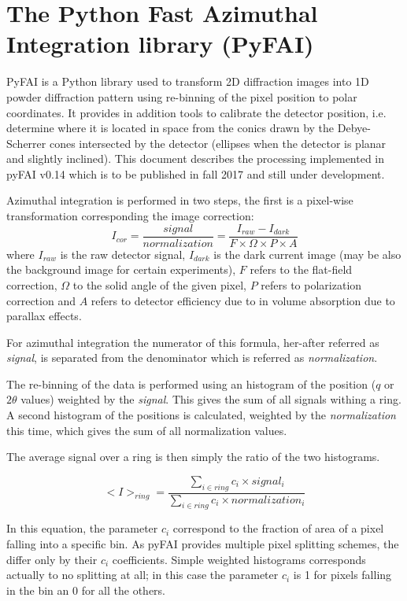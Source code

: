 \documentclass[preprint]{iucr}              %
\begin{document}
\section{The Python Fast Azimuthal Integration library (PyFAI)}

PyFAI is a Python \cite{python} library used to transform 2D diffraction images into
1D powder diffraction pattern using re-binning of the pixel position to polar coordinates.
It provides in addition tools to calibrate the detector position, i.e. determine
where it is located in space from the conics drawn by the Debye-Scherrer cones
intersected by the detector (ellipses when the detector is planar and slightly
inclined). This document describes the processing implemented in pyFAI
v0.14 which is to be published in fall 2017 and still under development.

Azimuthal integration is performed in two steps, the first is a pixel-wise
transformation corresponding the image correction:
$$
I_{cor} = \frac{signal}{normalization}  = \frac{I_{raw} - I_{dark}}{F \times
\Omega \times P \times A } $$
where $I_{raw}$ is the raw detector signal, $I_{dark}$ is the dark current
image (may be also the background image for certain experiments), $F$ refers to
the flat-field correction, $\Omega$ to the solid angle of the given pixel, $P$
refers to polarization correction and $A$ refers to detector efficiency due
to in volume absorption due to parallax effects.

For azimuthal integration the numerator of this formula, her-after referred as
\textit{signal}, is separated from the denominator which is referred as
\textit{normalization}.

The re-binning of the data is performed using an histogram of the position ($q$
or $2\theta$ values) weighted by the \textit{signal}.
This gives the sum of all signals withing a ring.
A second histogram of the positions is calculated, weighted by the
\textit{normalization} this time, which gives the sum of all normalization
values.

The average signal over a ring is then simply the ratio of the two histograms.

$$
<I>_{ring} = \frac{\sum\limits_{i \in ring} c_i \times signal_i}
                  {\sum\limits_{i \in ring} c_i \times normalization_i} 
$$

In this equation, the parameter $c_i$ correspond to the fraction of area of a
pixel falling into a specific bin. 
As pyFAI provides multiple pixel splitting schemes, the differ only by their
$c_i$ coefficients. 
Simple weighted histograms corresponds actually to no splitting at all; in this
case the parameter $c_i$ is 1 for pixels falling in the bin an 0 for all the
others.
  
\end{document}
